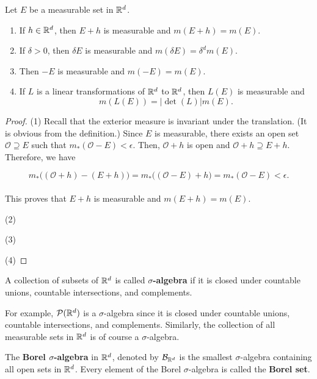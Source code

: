 \documentclass[12pt, a4paper, openany, twoside]{book}
\theoremstyle{definition}
\theoremstyle{remark}
\theoremstyle{plain}
\numberwithin{equation}{section}
\begin{document}
\vspace{5mm}
\begin{tcolorbox}[colback=yellow!10!white,colframe=brown!75!black,title=Proposition 1.3.6]\label{Proposition 1.3.6}
    Let $E$ be a measurable set in ${\mathbb {R}}^d$.
    \begin{enumerate}
        \item [(1)] If $h\in{\mathbb {R}}^d$, then $E+h$ is measurable and $m(E+h)=m(E)$.
        \item [(2)] If $\delta>0$, then $\delta E$ is measurable and $m(\delta E)=\delta^d m(E)$.
        \item [(3)] Then $-E$ is measurable and $m(-E)=m(E)$.
        \item [(4)] If $L$ is a linear transformations of ${\mathbb {R}}^d$ to ${\mathbb {R}}^d$, then $L(E)$ is measurable and 
        \[m(L(E))=|\det{(L)}|m(E).\]
    \end{enumerate}
\end{tcolorbox}
\begin{proof}
    (1) Recall that the exterior measure is invariant under the translation. (It is obvious from the definition.) Since $E$ is measurable, there exists an open set $\mathcal{O}\supseteq E$ such that $m_*(\mathcal{O}-E)<\epsilon$. Then, $\mathcal{O}+h$ is open and $\mathcal{O}+h\supseteq E+h$. Therefore, we have 

    \[m_*\big((\mathcal{O}+h)-(E+h)\big)=m_*\big((\mathcal{O}-E)+h\big)=m_*(\mathcal{O}-E)<\epsilon.\]
    \\
    This proves that $E+h$ is measurable and $m(E+h)=m(E)$.

    \vspace{5mm}
    (2) 

    \vspace{5mm}
    (3) 

    \vspace{5mm}
    (4)
\end{proof}
\vspace{5mm}
\begin{tcolorbox}[colback=yellow!10!white,colframe=blue!75!black,title=Definition 1.3.3]\label{Definition 1.3.3}
    A collection of subsets of ${\mathbb {R}}^d$ is called \textbf{$\sigma$-algebra} if it is closed under countable unions, countable intersections, and complements.
\end{tcolorbox}
\vspace{5mm}

For example, $\mathcal{P}({\mathbb {R}}^d)$ is a $\sigma$-algebra since it is closed under countable unions, countable intersections, and complements. Similarly, the collection of all measurable sets in ${\mathbb {R}}^d$ is of course a $\sigma$-algebra.
\vspace{5mm}
\begin{tcolorbox}[colback=yellow!10!white,colframe=blue!75!black,title=Definition 1.3.4]\label{Definition 1.3.4}
    The \textbf{Borel $\sigma$-algebra} in ${\mathbb {R}}^d$, denoted by $\mathcal{B}_{{\mathbb {R}}^d}$ is the smallest $\sigma$-algebra containing all open sets in ${\mathbb {R}}^d$. Every element of the Borel $\sigma$-algebra is called the \textbf{Borel set}.
\end{tcolorbox}
\end{document}
